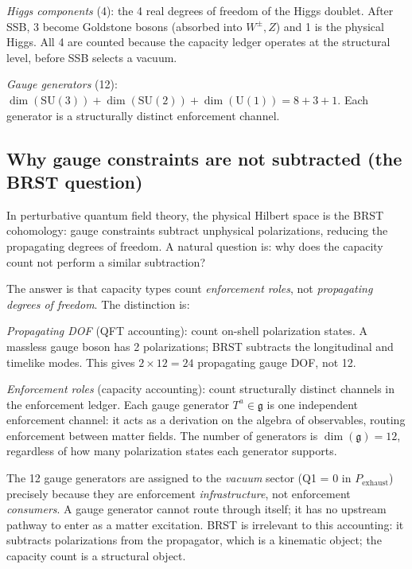 \documentclass[11pt,a4paper]{article}
\theoremstyle{definition}
\newcommand{\SU}{\mathrm{SU}}
\newcommand{\U}{\mathrm{U}}
\begin{document}
\noindent\textit{Higgs components} (4): the 4 real degrees of freedom
of the Higgs doublet.  After SSB, 3 become Goldstone bosons (absorbed
into $W^\pm, Z$) and 1 is the physical Higgs.  All 4 are counted
because the capacity ledger operates at the structural level, before
SSB selects a vacuum.

\noindent\textit{Gauge generators} (12): $\dim(\SU(3)) + \dim(\SU(2))
+ \dim(\U(1)) = 8 + 3 + 1$.  Each generator is a structurally distinct
enforcement channel.

\subsection{Why gauge constraints are not subtracted (the BRST question)}
\label{sec:BRST}

In perturbative quantum field theory, the physical Hilbert space is the
BRST cohomology: gauge constraints subtract unphysical polarizations,
reducing the propagating degrees of freedom.  A natural question is: why
does the capacity count not perform a similar subtraction?

The answer is that capacity types count \emph{enforcement roles}, not
\emph{propagating degrees of freedom}.  The distinction is:

\smallskip\noindent\textit{Propagating DOF} (QFT accounting): count
on-shell polarization states.  A massless gauge boson has 2 polarizations;
BRST subtracts the longitudinal and timelike modes.  This gives
$2 \times 12 = 24$ propagating gauge DOF, not 12.

\smallskip\noindent\textit{Enforcement roles} (capacity accounting):
count structurally distinct channels in the enforcement ledger.  Each
gauge generator $T^a \in \mathfrak{g}$ is one independent enforcement
channel: it acts as a derivation on the algebra of observables, routing
enforcement between matter fields.  The number of generators is
$\dim(\mathfrak{g}) = 12$, regardless of how many polarization states
each generator supports.

The 12 gauge generators are assigned to the \emph{vacuum} sector
(Q1 = 0 in $P_{\mathrm{exhaust}}$) precisely because they are
enforcement \emph{infrastructure}, not enforcement \emph{consumers}.
A gauge generator cannot route through itself; it has no upstream
pathway to enter as a matter excitation.  BRST is irrelevant to this
accounting: it subtracts polarizations from the propagator, which is a
kinematic object; the capacity count is a structural object.
\end{document}
